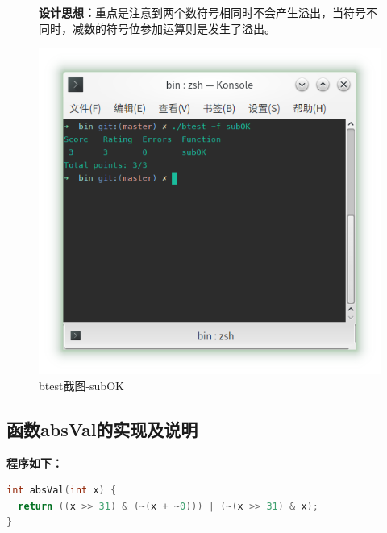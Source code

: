 \begin{figure}[H]
    \begin{minipage}[c]{0.5\linewidth}
        \textbf{设计思想：}重点是注意到两个数符号相同时不会产生溢出，当符号不同时，减数的符号位参加运算则是发生了溢出。
    \end{minipage}
    \begin{minipage}[c]{0.4\linewidth}
        \centering
        \includegraphics[width=0.9\linewidth]{figures/subOK}
        \caption{btest截图-subOK}
        \label{fig:subOK}
    \end{minipage}
\end{figure}

\subsection{函数absVal的实现及说明}
\textbf{程序如下：}

\begin{lstlisting}[language = c]
int absVal(int x) {
  return ((x >> 31) & (~(x + ~0))) | (~(x >> 31) & x);
}
\end{lstlisting}

